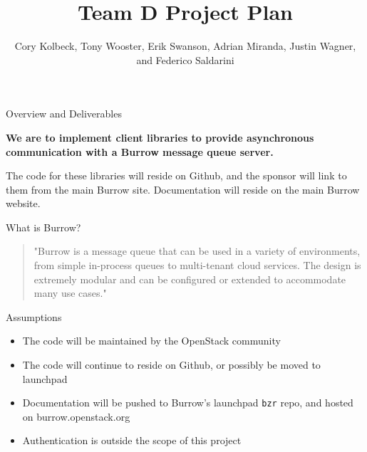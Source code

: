 \documentclass{beamer}
\begin{document}
\title{Team D Project Plan}
\author[CK, TW, ES, AM, JW, \& FS]{Cory Kolbeck, Tony Wooster, Erik Swanson, Adrian Miranda, Justin Wagner, and Federico Saldarini}

\begin{frame}
  \titlepage
\end{frame}

\begin{frame}{Overview and Deliverables}
  \begin{center}{
      \large
      \textbf{We are to implement client libraries to provide asynchronous communication with a Burrow message queue server.}

      \vspace{1cm}
      
      The code for these libraries will reside on Github, and the sponsor will link to them from the main Burrow site. 
      Documentation will reside on the main Burrow website. 
    }
  \end{center}
\end{frame}

\begin{frame}{What is Burrow?}
  \begin{quote}
    "Burrow is a message queue that can be used in a variety of environments, from simple in-process queues to multi-tenant cloud services. The design is extremely modular and can be configured or extended to accommodate many use cases."
  \end{quote}
\end{frame}

\begin{frame}{Assumptions}

  \begin{itemize}
  \item The code will be maintained by the OpenStack community
  \item The code will continue to reside on Github, or possibly be moved to launchpad
  \item Documentation will be pushed to Burrow's launchpad \texttt{bzr} repo, and hosted on burrow.openstack.org
  \item Authentication is outside the scope of this project
  \end{itemize}

\end{frame}
\end{document}
